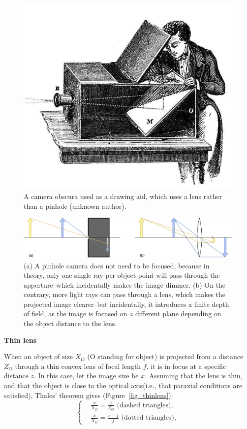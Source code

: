 \begin{figure}[hbtp]
	\centering
	\def\svgwidth{\columnwidth}
	\fontsize{10pt}{10pt}\selectfont
	\includegraphics[width=0.8\linewidth]{"../Chap2/Figures/Camera_Obscura.jpg"}
	\caption{A camera obscura used as a drawing aid, which uses a lens rather than a pinhole (unknown author). } 
	\label{fig_camobscura}
\end{figure}

\begin{figure}[hbtp]
	\centering
	\def\svgwidth{\columnwidth}
	\fontsize{10pt}{10pt}\selectfont
	\includegraphics[width=1\linewidth]{"../Chap2/Figures/Pinhole_Lens.png"}
	\caption{(a) A pinhole camera does not need to be focused, because in theory, only one single ray per object point will pass through the apperture--which incidentally makes the image dimmer. (b) On the contrary, more light rays can pass through a lens, which makes the projected image clearer--but incidentally, it introduces a finite depth of field, as the image is focused on a different plane depending on the object distance to the lens.} 
	\label{fig_pinholelens}
\end{figure}

\newpage
\noindent\textbf{Thin lens}

When an object of size \(X_O\) (O standing for object) is projected from a distance \(Z_O\) through a thin convex lens of focal length \(f\), it is in focus at a specific distance \(z\). In this case, let the image size be \(x\). Assuming that the lens is thin, and that the object is close to the optical axis(i.e., that paraxial conditions are satisfied), Thales' theorem gives (Figure~\ref{fig_thinlens}):
\begin{equation}
  \begin{cases}
  &\frac{x}{X_O} = \frac{z}{Z_O} \text{ (dashed triangles)},\\
  &\frac{x}{X_O} = \frac{z-f}{f} \text{ (dotted triangles)},
  \end{cases}
\end{equation}

